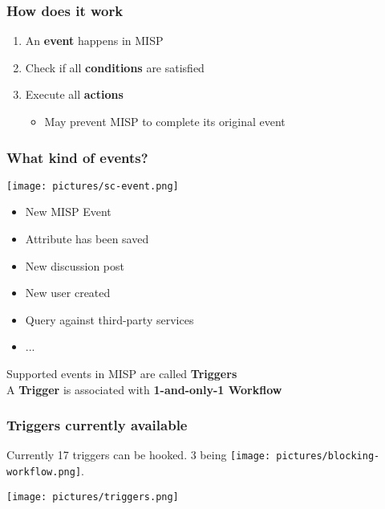 \begin{frame}
    \frametitle{How does it work}
    \begin{center}
    \end{center}
    \begin{enumerate}
        \item An \textbf{event} happens in MISP
        \item Check if all \textbf{conditions} are satisfied
        \item Execute all \textbf{actions}
        \begin{itemize}
            \item May prevent MISP to complete its original event
        \end{itemize}
    \end{enumerate}
\end{frame}

\begin{frame}
    \frametitle{What kind of events?}
    \texttt{[image: pictures/sc-event.png]}
    \vspace*{0.5em}
    \begin{itemize}
        \item New MISP Event
        \item Attribute has been saved
        \item New discussion post
        \item New user created
        \item Query against third-party services
        \item ...
    \end{itemize}
    \vspace*{1em}
    {\Large {}} Supported events in MISP are called \textbf{Triggers}\\
    {\Large {}} A \textbf{Trigger} is associated with \textbf{1-and-only-1 Workflow}
\end{frame}

\begin{frame}
    \frametitle{Triggers currently available}
    Currently 17 triggers can be hooked. 3 being \texttt{[image: pictures/blocking-workflow.png]}.
    \begin{center}
        \texttt{[image: pictures/triggers.png]}
    \end{center}
\end{frame}

